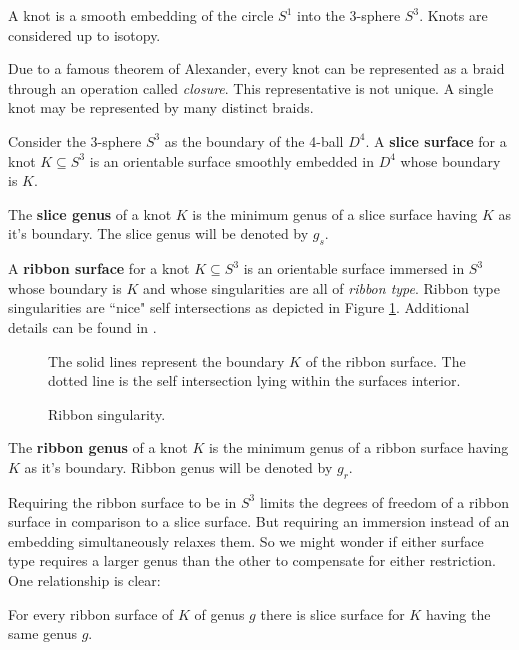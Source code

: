 \documentclass[12pt]{thesis}
\begin{document}
\begin{definition}
    A knot is a smooth embedding of the circle $S^{1}$ into the 3-sphere $S^{3}$.
    Knots are considered up to isotopy.
\end{definition}

Due to a famous theorem of Alexander, every knot 
can be represented as a braid through an operation
called \textit{closure}.
This representative is not unique.
A single knot may be represented by many distinct braids.

\begin{definition}
Consider the 3-sphere $S^{3}$ as the boundary of the 4-ball $D^{4}$.
A \textbf{slice surface} for a knot $K \subseteq S^{3}$
is an orientable surface smoothly embedded in $D^{4}$ 
whose boundary is $K$.
\end{definition}

\begin{definition}
    The \textbf{slice genus} of a knot $K$ is the minimum genus
    of a slice surface having $K$ as it's boundary.
    The slice genus will be denoted by $g_{s}$.
\end{definition}

\begin{definition}
    A \textbf{ribbon surface} for a knot $K \subseteq S^{3}$
    is an orientable surface immersed in $S^{3}$
    whose boundary is $K$
    and whose singularities are all of \textit{ribbon type}.
    Ribbon type singularities are ``nice" self intersections
    as depicted in Figure \ref{fig:ribbon-singularity}.
    Additional details can be found in \cite{on-braided-surfaces}.
\end{definition}

\begin{figure}[h]
    \centering
    \def\svgwidth{6cm}
    
    \caption{Ribbon singularity.}

    The solid lines represent the boundary $K$
    of the ribbon surface. The dotted line
    is the self intersection lying within the
    surfaces interior.
    \label{fig:ribbon-singularity}
\end{figure}


\begin{definition}
    The \textbf{ribbon genus} of a knot $K$ is the minimum genus
    of a ribbon surface having $K$ as it's boundary.
    Ribbon genus will be denoted by $g_{r}$.
\end{definition}

Requiring the ribbon surface to be in $S^{3}$
limits the degrees of freedom of a ribbon surface in comparison to a slice surface.
But requiring an immersion instead of an embedding simultaneously relaxes them.
So we might wonder if either surface type requires a larger genus than the other
to compensate for either restriction.
One relationship is clear:
\begin{proposition}
    For every ribbon surface of $K$ of genus $g$
    there is slice surface for $K$ having the same genus $g$.
\end{proposition}
\end{document}
